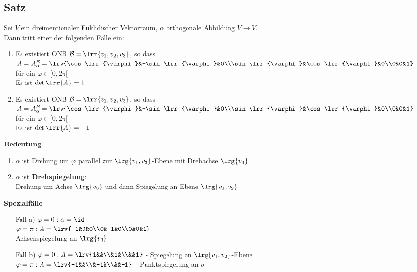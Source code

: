 \subsection{Satz}
	Sei $V$ ein dreimentionaler Euklidischer Vektorraum, $\alpha$ orthogonale Abbildung $V\rightarrow V$.\\
	Dann tritt einer der folgenden Fälle ein:
	\begin{enumerate}
		\item Es existiert ONB $\mathcal{B}=\lrr{v_1,v_2,v_3}$, so dass $A=A_{\alpha}^{\mathcal{B}}=\lrv{\cos\lrr{\varphi}&-\sin\lrr{\varphi}&0\\\sin\lrr{\varphi}&\cos\lrr{\varphi}&0\\0&0&1}$ für ein $\varphi\in [0,2\pi[$\\
			Es ist $\det\lrr{A}=1$
		\item Es existiert ONB $\mathcal{B}=\lrr{v_1,v_2,v_3}$, so dass $A=A_{\alpha}^{\mathcal{B}}=\lrv{\cos\lrr{\varphi}&-\sin\lrr{\varphi}&0\\\sin\lrr{\varphi}&\cos\lrr{\varphi}&0\\0&0&1}$ für ein $\varphi\in [0,2\pi[$\\
			Es ist $\det\lrr{A}=-1$
	\end{enumerate}
	\textbf{Bedeutung}
	\begin{enumerate}
		\item $\alpha$ ist Drehung um $\varphi$ parallel zur $\lrg{v_1,v_2}$-Ebene mit Drehachse $\lrg{v_3}$
			
		
		\item $\alpha$ ist \textbf{Drehspiegelung}:\\
			Drehung um Achse $\lrg{v_3}$ und dann Spiegelung an Ebene $\lrg{v_1,v_2}$
	\end{enumerate}
	\textbf{Spezialfälle}
	\begin{enumerate}
		\item[Fall a)] $\varphi=0 : \alpha=\id$\\
			$\varphi=\pi: A=\lrv{-1&0&0\\0&-1&0\\0&0&1}$\\
			Achsenspiegelung an $\lrg{v_3}$
		\item[Fall b)] $\varphi=0 : A=\lrv{1&&\\&1&\\&&1}$ - Spiegelung an $\lrg{v_1,v_2}$-Ebene\\
			$\varphi=\pi : A=\lrv{-1&&\\&-1&\\&&-1}$ - Punktspiegelung an $\sigma$
	\end{enumerate}

